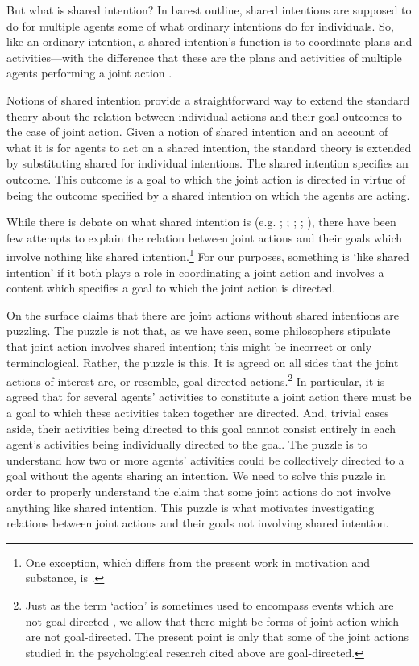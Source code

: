 \documentclass[12pt,a4paper]{extarticle}
\begin{document}
But what is shared intention?  
In barest outline, shared intentions are supposed to do for multiple agents some of what ordinary intentions do for individuals.  So, like an ordinary intention, a shared intention's function is to coordinate plans and activities---with the difference that these are the plans and activities of multiple agents performing a joint action \citep{Bratman:1993je}.


Notions of shared intention provide a straightforward way to extend the standard theory about the relation between individual actions and their goal-outcomes to the case of joint action.  
Given a notion of shared intention and an account of what it is for agents to act on a shared intention, 
the standard theory is extended by substituting shared for individual intentions.  The shared intention specifies an outcome.  This outcome is a goal to which the joint action is directed in virtue of being the outcome specified by a shared intention on which the agents are acting.

While there is debate on what shared intention is (e.g. 
	\citealp{Kutz:2000si}; 
	\citealp{Tollefsen:2005vh}; 
	\citealp{gilbert_walking_1990};
	\citealp[pp.\ 74--81]{miller_social_2001};
	\citealp{tuomela_collective_2000}), 
there have been few attempts to explain the relation between joint actions and their goals which  involve nothing like shared intention.\footnote{ 
One exception, which differs from the present work in motivation and substance, is \citet{Roth:2004ki}.
}
For our purposes, something is `like shared intention' if it both plays a role in coordinating a joint action and  involves a content which specifies a goal to which the joint action is directed.




On the surface claims that there are joint actions without shared intentions are puzzling.  
The puzzle is not that, as we have seen, some philosophers stipulate that joint action involves shared intention; this might be incorrect or  only terminological.
Rather, the puzzle is this.
It is agreed on all sides that the joint actions of interest are, or resemble, goal-directed actions.\footnote{
Just as the term `action' is sometimes used to encompass events which are not goal-directed \citep[e.g.][]{Hursthouse:1991rd}, 
we allow that there might be forms of joint action which are not goal-directed.
The present point is only that some of the joint actions studied in the psychological research cited above are goal-directed.
}
In particular, it is agreed that for several agents' activities to constitute a joint action there must be a goal to which these activities taken together are directed.
And, trivial cases aside, their activities being directed to this goal cannot consist entirely in each agent's activities being individually directed to the goal.
The puzzle is to understand how two or more agents' activities could be collectively directed to a goal without the agents sharing an intention.
We need to solve this puzzle in order to properly understand the claim that some joint actions do not involve anything like shared intention.  
This puzzle is what motivates investigating relations between joint actions and their goals not involving shared intention.
\end{document}
